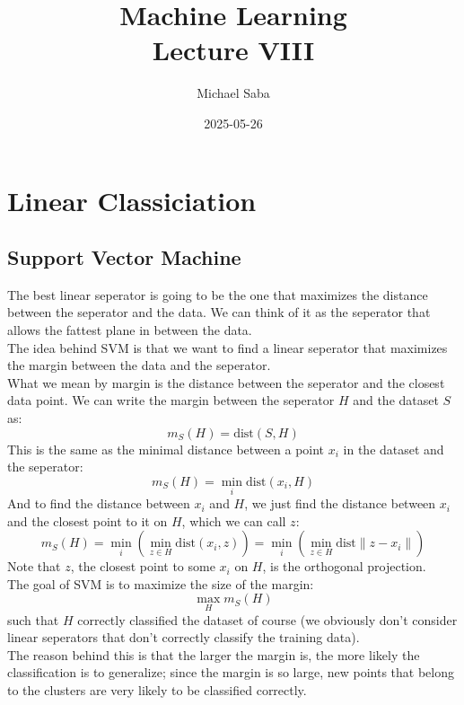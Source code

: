 \documentclass[12pt]{article}
\title{%
    \Huge Machine Learning \\
    \Large Lecture VIII
}
\date{2025-05-26}
\author{Michael Saba}
\begin{document}
\maketitle
\newpage
\setlength{\parindent}{0pt}

\section*{Linear Classiciation}

\subsection*{Support Vector Machine}

The best linear seperator is going to be the
one that maximizes the distance between the
seperator and the data.
We can think of it as the seperator that allows
the fattest plane in between the data. \\

The idea behind SVM is that we want
to find a linear seperator that maximizes
the margin between the data and the seperator. \\

What we mean by margin is the distance
between the seperator and the closest
data point.
We can write the margin between the seperator $H$ 
and the dataset $S$ as:
\[ m_S(H) = \text{dist}(S, H) \]
This is the same as the minimal distance
between a point $x_i$ in the dataset and the 
seperator:
\[ m_S(H) = \min_i \text{dist}(x_i, H) \]
And to find the distance between $x_i$
and $H$, we just find the distance between 
$x_i$ and the closest point to it on $H$,
which we can call $z$:
\[ m_S(H) = \min_i (\min_{z \in H} \text{dist}(x_i, z))
= \min_i (\min_{z \in H} \text{dist}\|z - x_i\|) \]
Note that $z$, the closest point to some $x_i$
on $H$, is the orthogonal projection. \\

The goal of SVM is to maximize the size of the
margin:
\[ \max_H m_S(H) \]
such that $H$ correctly classified the
dataset of course
(we obviously don't consider linear seperators
that don't correctly classify the training data). \\
The reason behind this is that the larger the
margin is, the more likely the classification is
to generalize; since the margin is so large,
new points that belong to the clusters are very
likely to be classified correctly. \\
\end{document}
